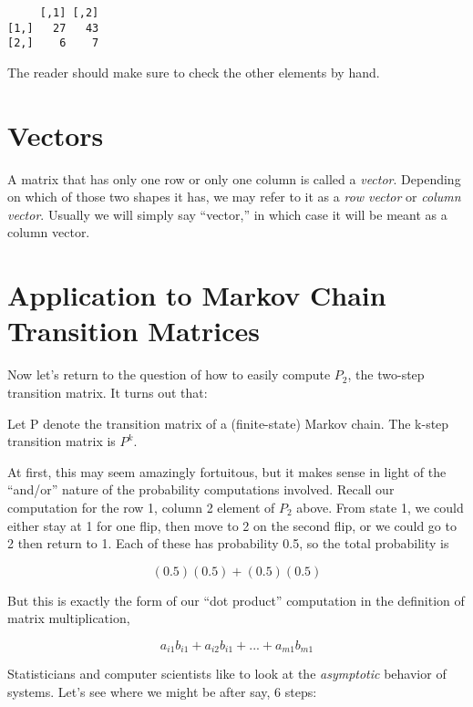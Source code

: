 \documentclass[
  letterpaper,
  DIV=11,
  numbers=noendperiod,
  oneside]{scrreprt}
\begin{document}
\begin{verbatim}
     [,1] [,2]
[1,]   27   43
[2,]    6    7
\end{verbatim}

The reader should make sure to check the other elements by hand.

\hypertarget{vectors}{%
\section{Vectors}\label{vectors}}

A matrix that has only one row or only one column is called a
\emph{vector}. Depending on which of those two shapes it has, we may
refer to it as a \emph{row vector} or \emph{column vector}. Usually we
will simply say ``vector,'' in which case it will be meant as a column
vector.

\hypertarget{sec-introMCs}{%
\section{Application to Markov Chain Transition
Matrices}\label{sec-introMCs}}

Now let's return to the question of how to easily compute \(P_2\), the
two-step transition matrix. It turns out that:

Let P denote the transition matrix of a (finite-state) Markov chain. The
k-step transition matrix is \(P^k\).

At first, this may seem amazingly fortuitous, but it makes sense in
light of the ``and/or'' nature of the probability computations involved.
Recall our computation for the row 1, column 2 element of \(P_2\) above.
From state 1, we could either stay at 1 for one flip, then move to 2 on
the second flip, or we could go to 2 then return to 1. Each of these has
probability 0.5, so the total probability is

\[
(0.5)(0.5) + (0.5)(0.5)
\]

But this is exactly the form of our ``dot product'' computation in the
definition of matrix multiplication,

\[
a_{i1} b_{i1} +
a_{i2} b_{i1} + ... +
a_{m1} b_{m1} 
\]

Statisticians and computer scientists like to look at the
\emph{asymptotic} behavior of systems. Let's see where we might be after
say, 6 steps:{}
\end{document}
